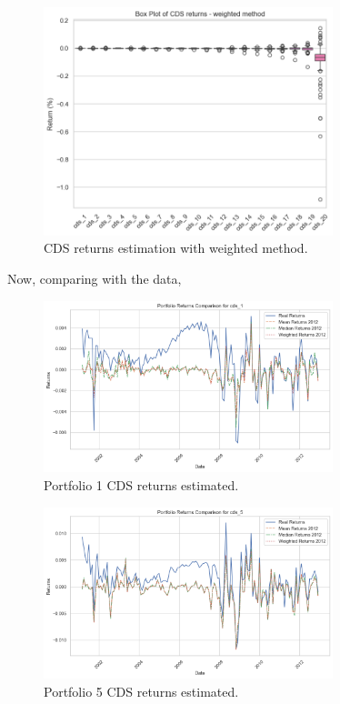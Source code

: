 \documentclass{article}
\begin{document}
\begin{Data science tools for finance final project}
\begin{figure}[H]
    \centering
    \includegraphics[width=0.75\textwidth]{../assets/cds_returns_boxplots_weighted.png}
    \caption{\label{fig:myplot}CDS returns estimation with weighted method.}
    \end{figure}       

Now, comparing with the \cite{kelly2017} data, 

\begin{figure}[H]
    \centering
    \includegraphics[width=0.75\textwidth]{../assets/returns_cds1_insample.png}
    \caption{\label{fig:myplot}Portfolio 1 CDS returns estimated.}
    \end{figure}

\begin{figure}[H]
    \centering
    \includegraphics[width=0.75\textwidth]{../assets/returns_cds5_insample.png}
    \caption{\label{fig:myplot}Portfolio 5 CDS returns estimated.}
    \end{figure}    


\end{Data science tools for finance final project}
\end{document}
